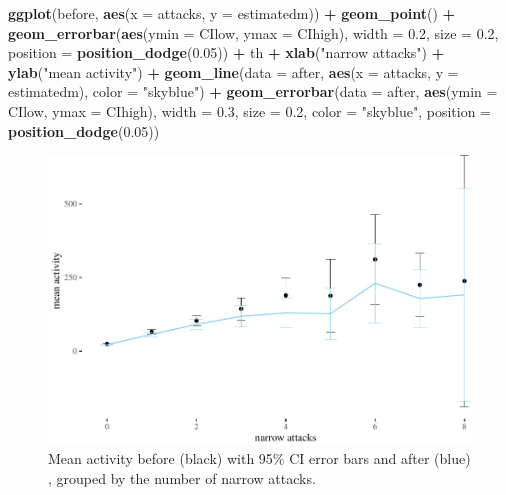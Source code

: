 \documentclass[10pt,]{scrartcl}
\newenvironment{Shaded}{\begin{snugshade}}{\end{snugshade}}
\newcommand{\KeywordTok}[1]{\textcolor[rgb]{0.13,0.29,0.53}{\textbf{#1}}}
\newcommand{\DataTypeTok}[1]{\textcolor[rgb]{0.13,0.29,0.53}{#1}}
\newcommand{\FloatTok}[1]{\textcolor[rgb]{0.00,0.00,0.81}{#1}}
\newcommand{\StringTok}[1]{\textcolor[rgb]{0.31,0.60,0.02}{#1}}
\newcommand{\OperatorTok}[1]{\textcolor[rgb]{0.81,0.36,0.00}{\textbf{#1}}}
\newcommand{\NormalTok}[1]{#1}
\begin{document}
\begin{Shaded}
\begin{Highlighting}[]
\KeywordTok{ggplot}\NormalTok{(before, }\KeywordTok{aes}\NormalTok{(}\DataTypeTok{x =}\NormalTok{ attacks, }\DataTypeTok{y =}\NormalTok{ estimatedm)) }\OperatorTok{+}\StringTok{ }\KeywordTok{geom_point}\NormalTok{() }\OperatorTok{+}
\StringTok{    }\KeywordTok{geom_errorbar}\NormalTok{(}\KeywordTok{aes}\NormalTok{(}\DataTypeTok{ymin =}\NormalTok{ CIlow, }\DataTypeTok{ymax =}\NormalTok{ CIhigh), }\DataTypeTok{width =} \FloatTok{0.2}\NormalTok{,}
        \DataTypeTok{size =} \FloatTok{0.2}\NormalTok{, }\DataTypeTok{position =} \KeywordTok{position_dodge}\NormalTok{(}\FloatTok{0.05}\NormalTok{)) }\OperatorTok{+}\StringTok{ }\NormalTok{th }\OperatorTok{+}\StringTok{ }\KeywordTok{xlab}\NormalTok{(}\StringTok{"narrow attacks"}\NormalTok{) }\OperatorTok{+}
\StringTok{    }\KeywordTok{ylab}\NormalTok{(}\StringTok{"mean activity"}\NormalTok{) }\OperatorTok{+}\StringTok{ }\KeywordTok{geom_line}\NormalTok{(}\DataTypeTok{data =}\NormalTok{ after, }\KeywordTok{aes}\NormalTok{(}\DataTypeTok{x =}\NormalTok{ attacks,}
    \DataTypeTok{y =}\NormalTok{ estimatedm), }\DataTypeTok{color =} \StringTok{"skyblue"}\NormalTok{) }\OperatorTok{+}\StringTok{ }\KeywordTok{geom_errorbar}\NormalTok{(}\DataTypeTok{data =}\NormalTok{ after,}
    \KeywordTok{aes}\NormalTok{(}\DataTypeTok{ymin =}\NormalTok{ CIlow, }\DataTypeTok{ymax =}\NormalTok{ CIhigh), }\DataTypeTok{width =} \FloatTok{0.3}\NormalTok{, }\DataTypeTok{size =} \FloatTok{0.2}\NormalTok{,}
    \DataTypeTok{color =} \StringTok{"skyblue"}\NormalTok{, }\DataTypeTok{position =} \KeywordTok{position_dodge}\NormalTok{(}\FloatTok{0.05}\NormalTok{))}
\end{Highlighting}
\end{Shaded}

\normalsize

\begin{figure}

\begin{center}\includegraphics[width=1\linewidth]{redditAnalysisWalkthrough_files/figure-latex/unnamed-chunk-111-1} \end{center}
\caption{Mean activity before (black) with 95\% CI error bars and after (blue) , grouped by the number of narrow attacks.}
\end{figure}
\end{document}
